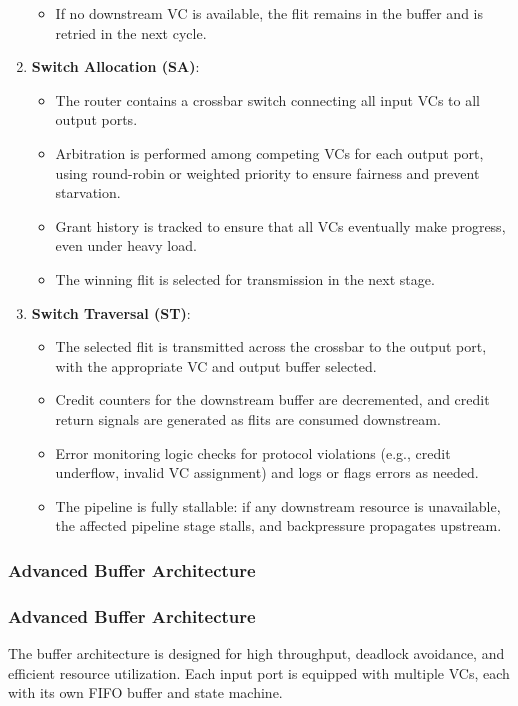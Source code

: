 \documentclass[11pt,a4paper]{article}
\begin{document}
\begin{enumerate}
\begin{itemize}
        \item If no downstream VC is available, the flit remains in the buffer and is retried in the next cycle.
    \end{itemize}
    \item \textbf{Switch Allocation (SA)}:
    \begin{itemize}
        \item The router contains a crossbar switch connecting all input VCs to all output ports.
        \item Arbitration is performed among competing VCs for each output port, using round-robin or weighted priority to ensure fairness and prevent starvation.
        \item Grant history is tracked to ensure that all VCs eventually make progress, even under heavy load.
        \item The winning flit is selected for transmission in the next stage.
    \end{itemize}
    \item \textbf{Switch Traversal (ST)}:
    \begin{itemize}
        \item The selected flit is transmitted across the crossbar to the output port, with the appropriate VC and output buffer selected.
        \item Credit counters for the downstream buffer are decremented, and credit return signals are generated as flits are consumed downstream.
        \item Error monitoring logic checks for protocol violations (e.g., credit underflow, invalid VC assignment) and logs or flags errors as needed.
        \item The pipeline is fully stallable: if any downstream resource is unavailable, the affected pipeline stage stalls, and backpressure propagates upstream.
    \end{itemize}
\end{enumerate}

\subsubsection{Advanced Buffer Architecture}

\subsubsection{Advanced Buffer Architecture}

The buffer architecture is designed for high throughput, deadlock avoidance, and efficient resource utilization. Each input port is equipped with multiple VCs, each with its own FIFO buffer and state machine.
\end{document}
